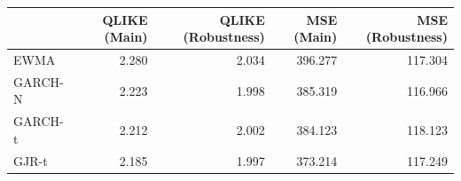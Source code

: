 \begin{tabular}{lrrrr}
\toprule
 & QLIKE (Main) & QLIKE (Robustness) & MSE (Main) & MSE (Robustness) \\
\midrule
EWMA & 2.280 & 2.034 & 396.277 & 117.304 \\
GARCH-N & 2.223 & 1.998 & 385.319 & 116.966 \\
GARCH-t & 2.212 & 2.002 & 384.123 & 118.123 \\
GJR-t & 2.185 & 1.997 & 373.214 & 117.249 \\
\bottomrule
\end{tabular}
